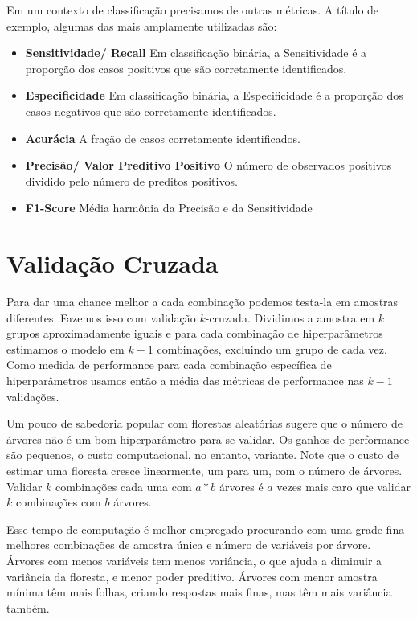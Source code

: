 Em um contexto de classificação precisamos de outras métricas. A título de exemplo, algumas das mais amplamente utilizadas são:

\begin{itemize}
    \item \textbf{Sensitividade/ Recall} \newline
    Em classificação binária, a Sensitividade é a proporção dos casos positivos que são corretamente identificados.
    \item \textbf{Especificidade} \newline
    Em classificação binária, a Especificidade é a proporção dos casos negativos que são corretamente identificados.
    \item \textbf{Acurácia} \newline
    A fração de casos corretamente identificados. 
    \item \textbf{Precisão/ Valor Preditivo Positivo} \newline
    O número de observados positivos dividido pelo número de preditos positivos.
    \item \textbf{F1-Score} \newline
    Média harmônia da Precisão e da Sensitividade
\end{itemize}


\section{Validação Cruzada}

Para dar uma chance melhor a cada combinação podemos testa-la em amostras diferentes. Fazemos isso com validação $k$-cruzada. Dividimos a amostra em $k$ grupos aproximadamente iguais e para cada combinação de hiperparâmetros estimamos o modelo em $k-1$ combinações, excluindo um grupo de cada vez. Como medida de performance para cada combinação específica de hiperparâmetros usamos então a média das métricas de performance nas $k-1$ validações. 

Um pouco de sabedoria popular com florestas aleatórias sugere que o número de árvores não é um bom hiperparâmetro para se validar. Os ganhos de performance são pequenos, o custo computacional, no entanto, variante. Note que o custo de estimar uma floresta cresce linearmente, um para um, com o número de árvores. Validar $k$ combinações cada uma com $a*b$ árvores é $a$ vezes mais caro que validar $k$ combinações com $b$ árvores. 

Esse tempo de computação é melhor empregado procurando com uma grade fina melhores combinações de amostra única e número de variáveis por árvore. Árvores com menos variáveis tem menos variância, o que ajuda a diminuir a variância da floresta, e menor poder preditivo. Árvores com menor amostra mínima têm mais folhas, criando respostas mais finas, mas têm mais variância também. 


